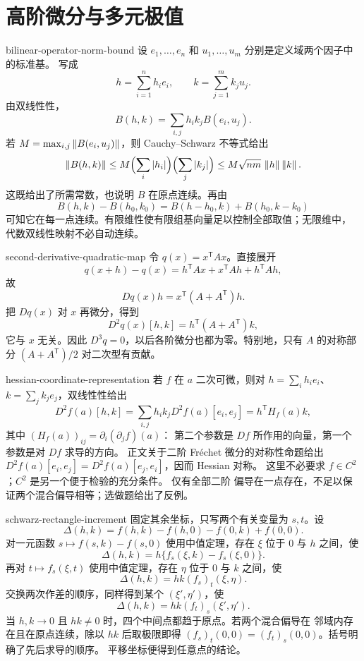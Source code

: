 \chapter{高阶微分与多元极值}
\label{chap:higher-differentials-extrema-solutions}

\begin{solution}{bilinear-operator-norm-bound}
设 $e_1,\ldots,e_n$ 和 $u_1,\ldots,u_m$ 分别是定义域两个因子中的标准基。
写成
\[
 h=\sum_{i=1}^nh_i e_i,\qquad k=\sum_{j=1}^mk_j u_j.
\]
由双线性性，
\[
 B(h,k)=\sum_{i,j}h_i k_jB(e_i,u_j).
\]
若 $M=\max_{i,j}\left\lVert B(e_i,u_j)\right\rVert$，则 Cauchy--Schwarz 不等式给出
\[
 \left\lVert B(h,k)\right\rVert
 \le M\Bigl(\sum_i|h_i|\Bigr)\Bigl(\sum_j|k_j|\Bigr)
 \le M\sqrt{nm}\,\left\lVert h\right\rVert\left\lVert k\right\rVert.
\]
这既给出了所需常数，也说明 $B$ 在原点连续。再由
\[
 B(h,k)-B(h_0,k_0)=B(h-h_0,k)+B(h_0,k-k_0)
\]
可知它在每一点连续。有限维性使有限组基向量足以控制全部取值；无限维中，
代数双线性映射不必自动连续。
\end{solution}

\begin{solution}{second-derivative-quadratic-map}
令 $q(x)=x^{\mathsf T}Ax$。直接展开
\[
 q(x+h)-q(x)=h^{\mathsf T}Ax+x^{\mathsf T}Ah+h^{\mathsf T}Ah,
\]
故
\[
 Dq(x)h=x^{\mathsf T}(A+A^{\mathsf T})h.
\]
把 $Dq(x)$ 对 $x$ 再微分，得到
\[
 D^2q(x)[h,k]=h^{\mathsf T}(A+A^{\mathsf T})k,
\]
它与 $x$ 无关。因此 $D^3q=0$，以后各阶微分也都为零。特别地，只有
$A$ 的对称部分 $(A+A^{\mathsf T})/2$ 对二次型有贡献。
\end{solution}

\begin{solution}{hessian-coordinate-representation}
若 $f$ 在 $a$ 二次可微，则对
$h=\sum_i h_i e_i$、$k=\sum_j k_j e_j$，双线性性给出
\[
 D^2f(a)[h,k]
 =\sum_{i,j}h_i k_jD^2f(a)[e_i,e_j]
 =h^{\mathsf T}H_f(a)k,
\]
其中 $(H_f(a))_{ij}=\partial_i(\partial_jf)(a)$：
第二个参数是 \(Df\) 所作用的向量，第一个参数是对 \(Df\) 求导的方向。
正文关于二阶 Fréchet 微分的对称性命题给出
$D^2f(a)[e_i,e_j]=D^2f(a)[e_j,e_i]$，因而 Hessian 对称。
这里不必要求 \(f\in C^2\)；\(C^2\) 是另一个便于检验的充分条件。
仅有全部二阶
偏导在一点存在，不足以保证两个混合偏导相等；选做题给出了反例。
\end{solution}

\begin{solution}{schwarz-rectangle-increment}
固定其余坐标，只写两个有关变量为 $s,t$。设
\[
 \Delta(h,k)=f(h,k)-f(h,0)-f(0,k)+f(0,0).
\]
对一元函数 $s\mapsto f(s,k)-f(s,0)$ 使用中值定理，存在
$\xi$ 位于 $0$ 与 $h$ 之间，使
\[
 \Delta(h,k)=h\{f_s(\xi,k)-f_s(\xi,0)\}.
\]
再对 $t\mapsto f_s(\xi,t)$ 使用中值定理，存在 $\eta$ 位于 $0$ 与 $k$
之间，使
\[
 \Delta(h,k)=hk (f_s)_t(\xi,\eta).
\]
交换两次作差的顺序，同样得到某个 $(\xi',\eta')$，使
\[
 \Delta(h,k)=hk (f_t)_s(\xi',\eta').
\]
当 $h,k\to0$ 且 $hk\ne0$ 时，四个中间点都趋于原点。若两个混合偏导在
邻域内存在且在原点连续，除以 $hk$ 后取极限即得
$(f_s)_t(0,0)=(f_t)_s(0,0)$。括号明确了先后求导的顺序。
平移坐标便得到任意点的结论。
\end{solution}

